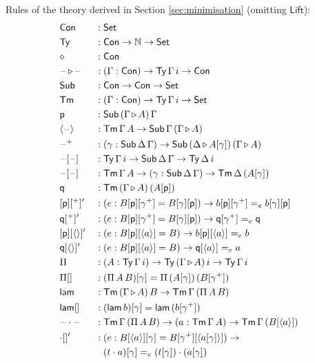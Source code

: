 \documentclass[sigplan,10pt,anonymous,review]{acmart}\settopmatter{printfolios=true,printccs=false,printacmref=false}
\newcommand{\ra}{\rightarrow}
\newcommand{\Set}{\mathsf{Set}}
\newcommand{\Ty}{\mathsf{Ty}}
\newcommand{\Tm}{\mathsf{Tm}}
\newcommand{\Con}{\mathsf{Con}}
\newcommand{\Sub}{\mathsf{Sub}}
\newcommand{\p}{\mathsf{p}}
\newcommand{\q}{\mathsf{q}}
\newcommand{\ext}{\mathop{\triangleright}}
\newcommand{\N}{\mathbb{N}}
\newcommand{\lam}{\mathsf{lam}}
\newcommand{\blank}{\mathord{\hspace{1pt}\text{--}\hspace{1pt}}} %
\newcommand{\Lift}{\mathsf{Lift}}
\begin{document}
Rules of the theory derived in Section \ref{sec:minimisation}
(omitting $\Lift$):
\begin{alignat*}{10}
  & \Con && : \Set \\
  & \Ty && : \Con\ra\N\ra\Set \\
  & \diamond && : \Con \\
  & \blank\ext\blank && : (\Gamma:\Con)\ra\Ty\,\Gamma\,i\ra\Con \\
  & \Sub && : \Con\ra\Con\ra\Set \\
  & \Tm && : (\Gamma:\Con)\ra\Ty\,\Gamma\,i\ra\Set \\
  & \p && : \Sub\,(\Gamma\ext A)\,\Gamma \\
  & \langle\blank\rangle && : \Tm\,\Gamma\,A\ra\Sub\,\Gamma\,(\Gamma\ext A) \\
  & \blank^+ && : (\gamma:\Sub\,\Delta\,\Gamma)\ra\Sub\,(\Delta\ext A[\gamma])\,(\Gamma\ext A) \\
  & \blank[\blank] && : \Ty\,\Gamma\,i\ra\Sub\,\Delta\,\Gamma\ra\Ty\,\Delta\,i \\
  & \blank[\blank] && : \Tm\,\Gamma\,A\ra(\gamma:\Sub\,\Delta\,\Gamma)\ra\Tm\,\Delta\,(A[\gamma]) \\
  & \q && : \Tm\,(\Gamma\ext A)\,(A[\p]) \\
  & [\p][^+]' && : (e:B[\p][\gamma^+] = B[\gamma][\p])\ra b[\p][\gamma^+] =_e b[\gamma][\p] \\
  & \q[^+]' && : (e:B[\p][\gamma^+] = B[\gamma][\p])\ra \q[\gamma^+] =_e \q \\
  & [\p][\langle\rangle]' && : (e:B[\p][\langle a\rangle] = B)\ra b[\p ][\langle a\rangle] =_e b \\
  & \q[\langle\rangle]' && : (e:B[\p][\langle a\rangle] = B)\ra \q[\langle a\rangle] =_e a \\
  & \Pi && : (A:\Ty\,\Gamma\,i)\ra\Ty\,(\Gamma\ext A)\,i\ra\Ty\,\Gamma\,i \\
  & \Pi[] && : (\Pi\,A\,B)[\gamma] = \Pi\,(A[\gamma])\,(B[\gamma^+]) \\
  & \lam && : \Tm\,(\Gamma\ext A)\,B\ra\Tm\,\Gamma\,(\Pi\,A\,B) \\
  & \lam[] && : (\lam\,b)[\gamma] = \lam\,(b[\gamma^+]) \\
  & \blank\cdot\blank && : \Tm\,\Gamma\,(\Pi\,A\,B)\ra(a:\Tm\,\Gamma\,A)\ra\Tm\,\Gamma\,(B[\langle a\rangle]) \\
  & {\cdot}[]' && : (e:B[\langle a\rangle][\gamma] = B[\gamma^+][\langle a[\gamma]\rangle])\ra \\
  & && \hphantom{{}:{}} (t\cdot a)[\gamma] =_e (t[\gamma])\cdot(a[\gamma]) \\

\end{alignat*}
\end{document}
